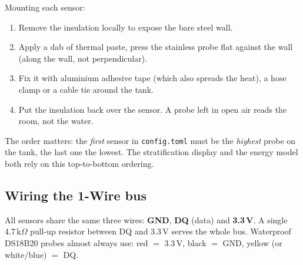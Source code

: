 \documentclass[11pt,a4paper,parskip=half]{scrartcl}
\newcommand{\code}[1]{\texttt{#1}}
\begin{document}
Mounting each sensor:
\begin{enumerate}
  \item Remove the insulation locally to expose the bare steel wall.
  \item Apply a dab of thermal paste, press the stainless probe flat against
        the wall (along the wall, not perpendicular).
  \item Fix it with aluminium adhesive tape (which also spreads the heat), a
        hose clamp or a cable tie around the tank.
  \item Put the insulation back over the sensor. A probe left in open air
        reads the room, not the water.
\end{enumerate}

\begin{warningbox}
The order matters: the \emph{first} sensor in \code{config.toml} must be the
\emph{highest} probe on the tank, the last one the lowest. The stratification
display and the energy model both rely on this top-to-bottom ordering.
\end{warningbox}

\subsection{Wiring the 1-Wire bus}
\label{sec:wiring}

All sensors share the same three wires: \textbf{GND}, \textbf{DQ} (data) and
\textbf{3.3\,V}. A single 4.7\,k$\Omega$ pull-up resistor between DQ and
3.3\,V serves the whole bus. Waterproof DS18B20 probes almost always use:
red $=$ 3.3\,V, black $=$ GND, yellow (or white/blue) $=$ DQ.
\end{document}
